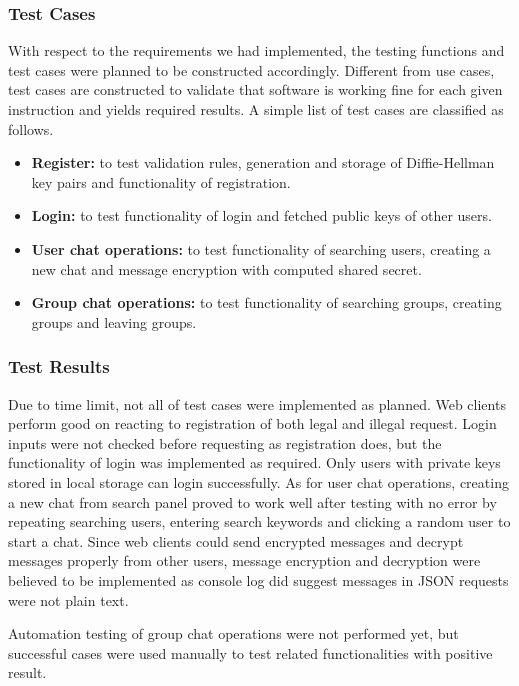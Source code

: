 \subsubsection{Test Cases}

With respect to the requirements we had implemented, the testing functions and test cases were planned to be constructed accordingly. Different from use cases, test cases are constructed to validate that software is working fine for each given instruction and yields required results. A simple list of test cases are classified as follows.

\begin{itemize}
    \item \textbf{Register:} to test validation rules, generation and storage of Diffie-Hellman key pairs and functionality of registration.
    \item \textbf{Login:} to test functionality of login and fetched public keys of other users.
    \item \textbf{User chat operations:} to test functionality of searching users, creating a new chat and message encryption with computed shared secret.
    \item \textbf{Group chat operations:} to test functionality of searching groups, creating groups and leaving groups.
\end{itemize}

\subsubsection{Test Results}

Due to time limit, not all of test cases were implemented as planned. Web clients perform good on reacting to registration of both legal and illegal request. Login inputs were not checked before requesting as registration does, but the functionality of login was implemented as required. Only users with private keys stored in local storage can login successfully. As for user chat operations, creating a new chat from search panel proved to work well after testing with no error by repeating searching users, entering search keywords and clicking a random user to start a chat. Since web clients could send encrypted messages and decrypt messages properly from other users, message encryption and decryption were believed to be implemented as console log did suggest messages in JSON requests were not plain text.

Automation testing of group chat operations were not performed yet, but successful cases were used manually to test related functionalities with positive result.

